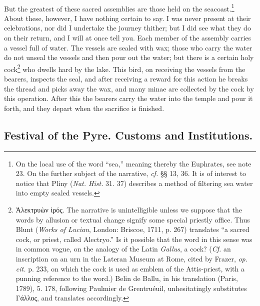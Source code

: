 \documentclass[a4paper, 11pt, oneside, polutonikogreek, english]{article}
\begin{document}
\paragraph{}
But the greatest of these sacred assemblies are those held on the seacoast.\footnote{On the local use of the word ``sea,'' meaning thereby the Euphrates, see note 23. On the further subject of the narrative, \emph{cf.} §§ 13, 36. It is of interest to notice that Pliny (\emph{Nat. Hist.} 31. 37) describes a method of filtering sea water into empty sealed vessels.} About these, however, I have nothing certain to say. I was never present at their celebrations, nor did I undertake the journey thither; but I did see what they do on their return, and I will at once tell you. Each member of the assembly carries a vessel full of water. The vessels are sealed with wax; those who carry the water do not unseal the vessels and then pour out the water; but there is a certain holy cock\footnote{Ἀλεκτρυὼν ἱρός. The narrative is unintelligible unless we suppose that the words by allusion or textual change signify some special priestly office. Thus Blunt (\emph{Works of Lucian}, London: Briscoe, 1711, p. 267) translates ``a sacred cock, or priest, called Alectryo.'' Is it possible that the word in this sense was in common vogue, on the analogy of the Latin \emph{Gallus}, a cock? (\emph{Cf.} an inscription on an urn in the Lateran Museum at Rome, cited by Frazer, \emph{op. cit.} p. 233, on which the cock is used as emblem of the Attis-priest, with a punning reference to the word.) Belin de Ballu, in his translation (Paris, 1789), 5. 178, following Paulmier de Grentruéuil, unhesitatingly substitutes Γάλλος, and translates accordingly.} who dwells hard by the lake. This bird, on receiving the vessels from the bearers, inspects the seal, and after receiving a reward for this action he breaks the thread and picks away the wax, and many minae are collected by the cock by this operation. After this the bearers carry the water into the temple and pour it forth, and they depart when the sacrifice is finished. 

\subsection{Festival of the Pyre. Customs and Institutions.}
\end{document}
